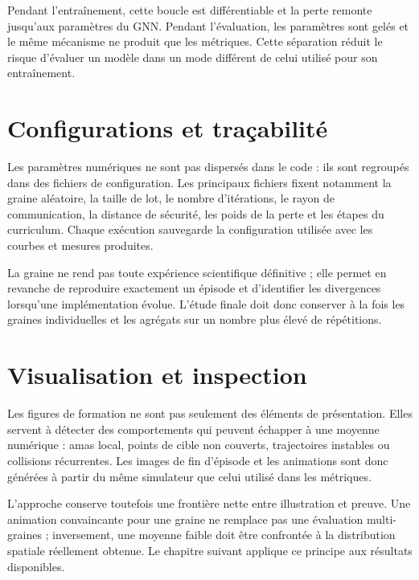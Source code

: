 Pendant l'entraînement, cette boucle est différentiable et la perte remonte jusqu'aux paramètres du GNN. Pendant l'évaluation, les paramètres sont gelés et le même mécanisme ne produit que les métriques. Cette séparation réduit le risque d'évaluer un modèle dans un mode différent de celui utilisé pour son entraînement.

\section{Configurations et traçabilité}
Les paramètres numériques ne sont pas dispersés dans le code : ils sont regroupés dans des fichiers de configuration. Les principaux fichiers fixent notamment la graine aléatoire, la taille de lot, le nombre d'itérations, le rayon de communication, la distance de sécurité, les poids de la perte et les étapes du curriculum. Chaque exécution sauvegarde la configuration utilisée avec les courbes et mesures produites.

La graine ne rend pas toute expérience scientifique définitive ; elle permet en revanche de reproduire exactement un épisode et d'identifier les divergences lorsqu'une implémentation évolue. L'étude finale doit donc conserver à la fois les graines individuelles et les agrégats sur un nombre plus élevé de répétitions.

\section{Visualisation et inspection}
Les figures de formation ne sont pas seulement des éléments de présentation. Elles servent à détecter des comportements qui peuvent échapper à une moyenne numérique : amas local, points de cible non couverts, trajectoires instables ou collisions récurrentes. Les images de fin d'épisode et les animations sont donc générées à partir du même simulateur que celui utilisé dans les métriques.

L'approche conserve toutefois une frontière nette entre illustration et preuve. Une animation convaincante pour une graine ne remplace pas une évaluation multi-graines ; inversement, une moyenne faible doit être confrontée à la distribution spatiale réellement obtenue. Le chapitre suivant applique ce principe aux résultats disponibles.
